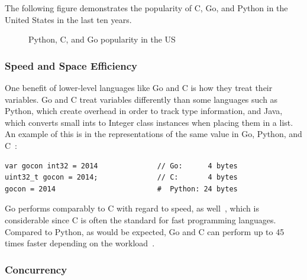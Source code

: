 \documentclass[10pt,letterpaper,onecolumn,journal]{IEEEtran}
\begin{document}
The following figure demonstrates the popularity of C, Go, and Python in the
United States in the last ten years.

\begin{figure}[H]
	\begin{center}
		\caption{Python, C, and Go popularity in the US~\cite{PYPL}}
	\end{center}
\end{figure}

\subsubsection{Speed and Space Efficiency}

One benefit of lower-level languages like Go and C is how they treat their
variables. Go and C treat variables differently than some languages such as
Python, which create overhead in order to track type information, and Java,
which converts small ints to Integer class instances when placing them in a
list. An example of this is in the representations of the same value in Go,
Python, and C~\cite{davecheney}:

\begin{lstlisting}
var gocon int32 = 2014              // Go:      4 bytes
uint32_t gocon = 2014;              // C:       4 bytes
gocon = 2014                        #  Python: 24 bytes
\end{lstlisting}

Go performs comparably to C with regard to speed, as well~\cite{benchmarks},
which is considerable since C is often the standard for fast programming
languages. Compared to Python, as would be expected, Go and C can perform up to
45 times faster depending on the workload~\cite{benchmarks}.

\subsubsection{Concurrency}
\end{document}
